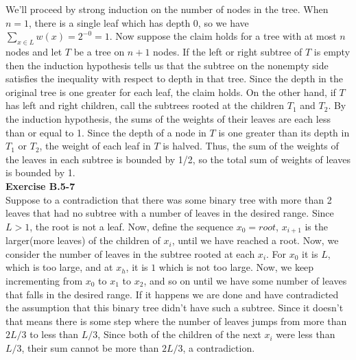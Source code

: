 \documentclass{article}
\begin{document}
We'll proceed by strong induction on the number of nodes in the tree.  When $n=1$, there is a single leaf which has depth 0, so we have $\sum_{x \in L} w(x) = 2^{-0} = 1$.  Now suppose the claim holds for a tree with at most $n$ nodes and let $T$ be a tree on $n+1$ nodes.  If the left or right subtree of $T$ is empty then the induction hypothesis tells us that the subtree on the nonempty side satisfies the inequality with respect to depth in that tree.  Since the depth in the original tree is one greater for each leaf, the claim holds. On the other hand, if $T$ has left and right children, call the subtrees rooted at the children $T_1$ and $T_2$.  By the induction hypothesis, the sums of the weights of their leaves are each less than or equal to 1.  Since the depth of a node in $T$ is one greater than its depth in $T_1$ or $T_2$, the weight of each leaf in $T$ is halved.  Thus, the sum of the weights of the leaves in each subtree is bounded by 1/2, so the total sum of weights of leaves is bounded by 1. \\

\noindent\textbf{Exercise B.5-7}\\
Suppose to a contradiction that there was some binary tree with more than 2 leaves that had no subtree with a number of leaves in the desired range. Since $L>1$, the root is not a leaf. Now, define the sequence $x_0 = root$, $x_{i+1}$ is the larger(more leaves) of the children of $x_i$, until we have reached a root. Now, we consider the number of leaves in the subtree rooted at each $x_i$. For $x_0$ it is $L$, which is too large, and at $x_h$, it is $1$ which is not too large. Now, we keep incrementing from $x_0$ to $x_1$ to $x_2$, and so on until we have some number of leaves that falls in the desired range. If it happens we are done and have contradicted the assumption that this binary tree didn't have such a subtree. Since it doesn't that means there is some step where the number of leaves jumps from more than $2L/3$ to less than $L/3$, Since both of the children of the next $x_i$ were less than $L/3$, their sum cannot be more than $2L/3$, a contradiction.
\end{document}
